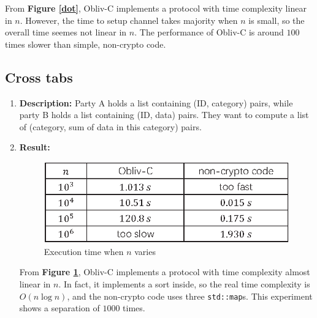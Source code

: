 \documentclass{article}
\newcommand{\Fig}[1]{\textbf{Figure \ref{#1}}}
\begin{document}
\begin{spacing}{1.1}
\begin{enumerate}
From \Fig{dot}, Obliv-C implements a protocol with time complexity linear in $n$. However,
the time to setup channel takes majority when $n$ is small, so the overall time seemes not
linear in $n$. The performance of Obliv-C is around $100$ times slower than simple, 
non-crypto code.

\end{enumerate}

\subsection{Cross tabs}

\begin{enumerate}

\item \textbf{Description:} Party A holds a list containing (ID, category) pairs, while
party B holds a list containing (ID, data) pairs. They want to compute a list of
(category, sum of data in this category) pairs.

\item \textbf{Result:}

\begin{figure}[H] 
\centering 
\includegraphics[scale=1]{cross.eps}
\caption{Execution time when $n$ varies}
\label{cross}
\end{figure}

From \Fig{cross}, Obliv-C implements a protocol with time complexity almost linear in $n$.
In fact, it implements a sort inside, so the real time complexity is $O(n\log n)$,
and the non-crypto code uses three \texttt{std::map}s.
This experiment shows a separation of $1000$ times.

\end{enumerate}


\end{spacing}
\end{document}
